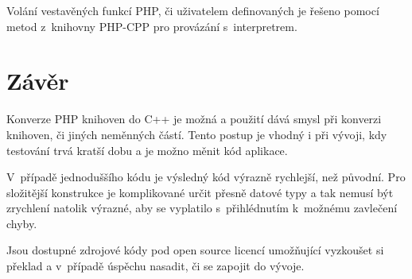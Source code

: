 \documentclass[czech]{ExcelAtFIT}
\begin{document}
	Volání vestavěných funkcí PHP, či uživatelem definovaných je řešeno pomocí metod z~knihovny PHP-CPP pro provázání s~interpretrem.









\section{Závěr}
\label{sec:Conclusions}


	Konverze PHP knihoven do C++ je možná a použití dává smysl při konverzi knihoven, či jiných neměnných částí. Tento postup je vhodný i při vývoji, kdy testování trvá kratší dobu a je možno měnit kód aplikace.



	V~případě jednoduššího kódu je výsledný kód výrazně rychlejší, než původní. Pro složitější konstrukce je komplikované určit přesně datové typy a tak nemusí být zrychlení natolik výrazné, aby se vyplatilo s~přihlédnutím k~možnému zavlečení chyby.





	Jsou dostupné zdrojové kódy pod open source licencí  umožňující vyzkoušet si překlad a v~případě úspěchu nasadit, či se zapojit do vývoje.
\end{document}
